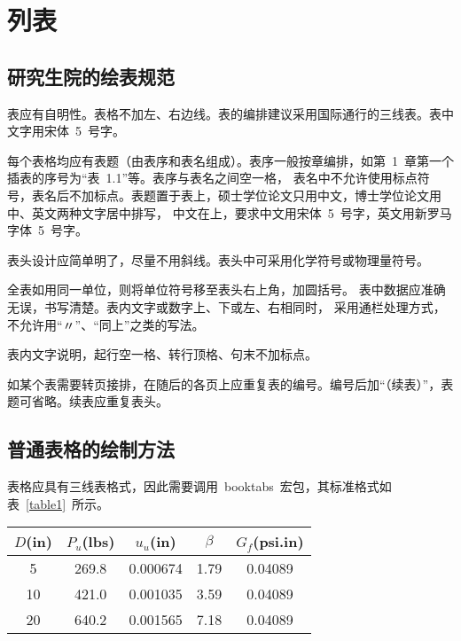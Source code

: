 
%
%
%

\chapter{列表}
\label{chap04}

\section{研究生院的绘表规范}

表应有自明性。表格不加左、右边线。表的编排建议采用国际通行的三线表。表中文字用宋体~5~号字。

每个表格均应有表题（由表序和表名组成）。表序一般按章编排，如第~1~章第一个插表的序号为“表~1.1”等。表序与表名之间空一格，
表名中不允许使用标点符号，表名后不加标点。表题置于表上，硕士学位论文只用中文，博士学位论文用中、英文两种文字居中排写，
中文在上，要求中文用宋体~5~号字，英文用新罗马字体~5~号字。

表头设计应简单明了，尽量不用斜线。表头中可采用化学符号或物理量符号。

全表如用同一单位，则将单位符号移至表头右上角，加圆括号。
表中数据应准确无误，书写清楚。表内文字或数字上、下或左、右相同时，
采用通栏处理方式，不允许用“〃”、“同上”之类的写法。

表内文字说明，起行空一格、转行顶格、句末不加标点。

如某个表需要转页接排，在随后的各页上应重复表的编号。编号后加“（续表）”，表题可省略。续表应重复表头。

\section{普通表格的绘制方法}

表格应具有三线表格式，因此需要调用~booktabs~宏包，其标准格式如表~\ref{table1}~所示。
\begin{table}[htbp]
\vspace{0.5em}\centering\wuhao
\begin{tabular}{ccccc}
\toprule[1.5pt]
$D$(in) & $P_u$(lbs) & $u_u$(in) & $\beta$ & $G_f$(psi.in)\\
\midrule[1pt]
 5 & 269.8 & 0.000674 & 1.79 & 0.04089\\
10 & 421.0 & 0.001035 & 3.59 & 0.04089\\
20 & 640.2 & 0.001565 & 7.18 & 0.04089\\
\bottomrule[1.5pt]
\end{tabular}
\end{table}

